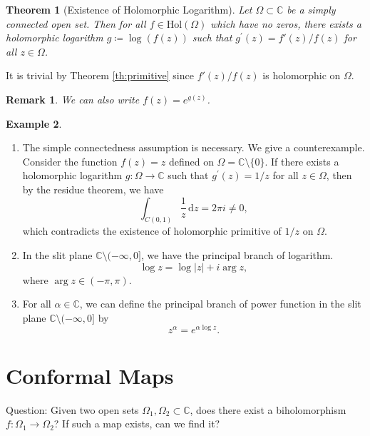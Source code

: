 \documentclass{article}
\newtheorem{theorem}{Theorem}[section]
\newtheorem*{remark}{Remark}
\theoremstyle{definition}
\newtheorem{example}[theorem]{Example}
\newcommand{\C}{\mathbb{C}}
\newcommand{\dd}{\mathrm{d}}
\newcommand{\hol}{\mathrm{Hol}}
\begin{document}
\begin{theorem}[Existence of Holomorphic Logarithm]\label{th:primitive log}
Let \(\Omega\subset\C\) be a simply connected open set. Then for all \(f\in\hol(\Omega)\) which have no zeros, there exists a holomorphic logarithm \(g\coloneq \log(f(z))\) such that \(g^{\prime}(z)=f'(z)/{f(z)}\) for all \(z\in\Omega\).
\end{theorem}
It is trivial by Theorem \ref{th:primitive} since $f'(z)/{f(z)}$ is holomorphic on $\Omega$.
\begin{remark}
    We can also write $f(z) = e^{g(z)}$.
\end{remark}
\begin{example}
    \begin{enumerate}
        \item  The simple connectedness assumption is necessary. We give a counterexample. Consider the function \(f(z)=z\) defined on \(\Omega=\C\setminus\{0\}\). If there exists a holomorphic logarithm \(g\colon \Omega\to\C\) such that \(g^{\prime}(z)=1/z\) for all \(z\in\Omega\), then by the residue theorem, we have
    \begin{equation*}
        \int_{C(0,1)} \frac{1}{z}\, \dd z = 2\pi i \neq 0,
    \end{equation*}
    which contradicts the existence of holomorphic primitive of \(1/z\) on \(\Omega\).
        \item In the slit plane $\C\setminus(-\infty,0]$, we have the principal branch of logarithm. 
        \begin{equation*}
            \log z = \log|z| + i \arg z,
        \end{equation*}
        where \(\arg z\in(-\pi,\pi)\).
        \item For all $\alpha\in \C$, we can define the principal branch of power function in the slit plane $\C\setminus(-\infty,0]$ by
        \begin{equation*}
            z^{\alpha} = e^{\alpha \log z}.
        \end{equation*}
    \end{enumerate}
\end{example}
\section{Conformal Maps}
Question: Given two open sets \(\Omega_1, \Omega_2\subset\C\), does there exist a biholomorphism \(f\colon\Omega_1\to\Omega_2\)? If such a map exists, can we find it?
\end{document}
